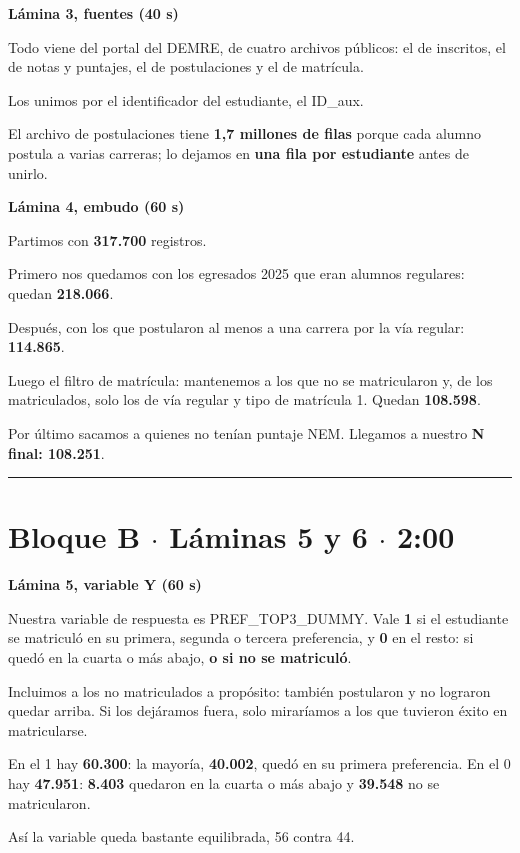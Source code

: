 \documentclass[11pt]{article}
\begin{document}
\textbf{Lámina 3, fuentes (40 s)}\par
\begin{guion}Todo viene del portal del DEMRE, de cuatro archivos públicos: el de inscritos, el de notas y puntajes, el de postulaciones y el de matrícula.\par Los unimos por el identificador del estudiante, el ID\_aux.\par El archivo de postulaciones tiene \textbf{1,7 millones de filas} porque cada alumno postula a varias carreras; lo dejamos en \textbf{una fila por estudiante} antes de unirlo.\end{guion}

\textbf{Lámina 4, embudo (60 s)}\par
\begin{guion}Partimos con \textbf{317.700} registros.\par Primero nos quedamos con los egresados 2025 que eran alumnos regulares: quedan \textbf{218.066}.\par Después, con los que postularon al menos a una carrera por la vía regular: \textbf{114.865}.\par Luego el filtro de matrícula: mantenemos a los que no se matricularon y, de los matriculados, solo los de vía regular y tipo de matrícula 1. Quedan \textbf{108.598}.\par Por último sacamos a quienes no tenían puntaje NEM. Llegamos a nuestro \textbf{N final: 108.251}.\end{guion}

\medskip\hrule\medskip

\section*{Bloque B $\cdot$ Láminas 5 y 6 $\cdot$ 2:00}

\textbf{Lámina 5, variable Y (60 s)}\par
\begin{guion}Nuestra variable de respuesta es PREF\_TOP3\_DUMMY. Vale \textbf{1} si el estudiante se matriculó en su primera, segunda o tercera preferencia, y \textbf{0} en el resto: si quedó en la cuarta o más abajo, \textbf{o si no se matriculó}.\par Incluimos a los no matriculados a propósito: también postularon y no lograron quedar arriba. Si los dejáramos fuera, solo miraríamos a los que tuvieron éxito en matricularse.\par En el 1 hay \textbf{60.300}: la mayoría, \textbf{40.002}, quedó en su primera preferencia. En el 0 hay \textbf{47.951}: \textbf{8.403} quedaron en la cuarta o más abajo y \textbf{39.548} no se matricularon.\par Así la variable queda bastante equilibrada, 56 contra 44.\end{guion}
\end{document}

